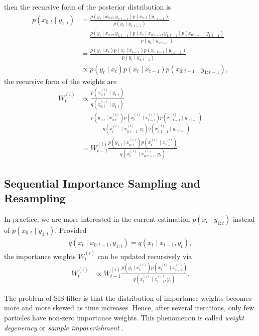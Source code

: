 then the recursive form of the posterior distribution is 
\begin{align*}
p(x_{0:t}\mid y_{1:t}) &= \frac{p(y_t \mid x_{0:t},y_{1:t-1})p(x_{0:t}\mid y_{1:t-1})}{p(y_t \mid y_{1:t-1})}\\
&= \frac{p(y_t \mid x_{0:t},y_{1:t-1}) p(x_t \mid x_{0:t-1},y_{1:t-1}) p(x_{0:t-1}\mid y_{1:t-1} ) }{p(y_t \mid y_{1:t-1})}\\
&= \frac{p(y_t \mid x_t ) p(x_t \mid x_{t-1}) p(x_{0:t-1}\mid y_{1:t-1} ) }{p(y_t \mid y_{1:t-1})}\\
&\propto p(y_t \mid x_t ) p(x_t \mid x_{t-1}) p(x_{0:t-1}\mid y_{1:t-1} ),
\end{align*}
the recursive form of the weights are
\begin{align*}
W_t^{(i)} &\propto \frac{p\left(x_{0:t}^{(i)}\mid y_{1:t}\right)}{q\left(x_{0:t}^{(i)}\mid y_{1:t}\right)}\\
&= \frac{ p\left(y_{1:t}\mid x_{0:t}^{(i)}\right) p\left(x_{t}^{(i)}\mid x_{t-1}^{(i)}\right)  p\left(x_{0:t-1}^{(i)}\mid y_{1:t-1}\right)}   { q\left(x_{t}^{(i)}\mid x_{0:t-1}^{(i)},y_{t}\right)  q\left(x_{0:t-1}^{(i)}\mid y_{1:t-1}\right) } \\
&= W_{t-1}^{(i)} \frac{ p\left(y_{1:t}\mid x_{0:t}^{(i)}\right) p\left(x_{t}^{(i)}\mid x_{t-1}^{(i)}\right) }   {q\left(x_{t}^{(i)}\mid x_{0:t-1}^{(i)},y_{t}\right)}.
\end{align*}

\subsection{Sequential Importance Sampling and Resampling}
 
In practice, we are more interested in the current estimation $p(x_t \mid y_{1:t})$ instead of $p(x_{0:t}\mid y_{1:t})$. Provided 
\begin{align*}
q(x_t \mid  x_{0:t-1},y_{1:t})=q(x_t \mid  x_{t-1},y_t ),
\end{align*}
the importance weights $W_t^{(i)}$ can be updated recursively via 
\begin{align*}
W_t^{(i)} &\propto W_{t-1}^{(i)} \frac{ p\left(y_t \mid x_t^{(i)}\right) p\left(x_{t}^{(i)}\mid x_{t-1}^{(i)}\right) }   {q\left(x_{t}^{(i)}\mid x_{t-1}^{(i)},y_{t}\right)}.
\end{align*}

The problem of SIS filter is that the distribution of importance weights becomes more and more skewed as time increases. Hence, after several iterations, only few particles have non-zero importance weights. This phenomenon is called \textit{weight degeneracy} or \textit{sample impoverishment} \citep{smcmip2011}.

